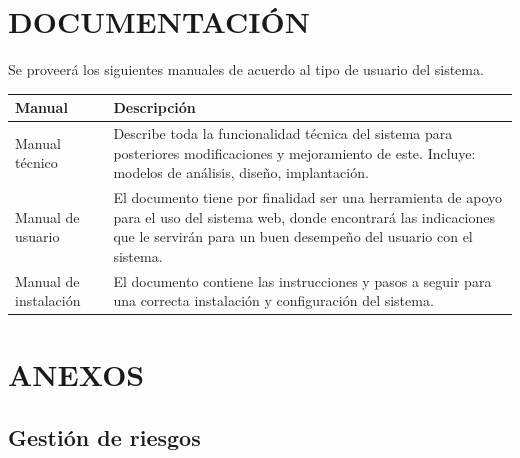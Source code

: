 \documentclass[11pt,letterpaper]{report}
\begin{document}
\chapter{DOCUMENTACIÓN}
Se proveerá los siguientes manuales de acuerdo al tipo de usuario del sistema.\\
\begin{center}
	\begin{tabular}{|l|p{8cm}|}
		\hline
		\textbf{Manual} & \textbf{Descripción} \\ \hline
		Manual técnico & Describe toda la funcionalidad técnica del sistema para posteriores modificaciones y mejoramiento de este.
		Incluye: modelos de análisis, diseño, implantación. \\ \hline
		Manual de usuario & El documento tiene por finalidad ser una herramienta de apoyo para el uso del sistema web, donde encontrará las indicaciones que le servirán para un buen desempeño del usuario con el sistema. \\ \hline
		Manual de instalación & El documento contiene las instrucciones y pasos a seguir para una correcta instalación y configuración del sistema. \\ \hline
	\end{tabular}
\end{center}
\chapter{ANEXOS}
\section{Gestión de riesgos}
\end{document}
